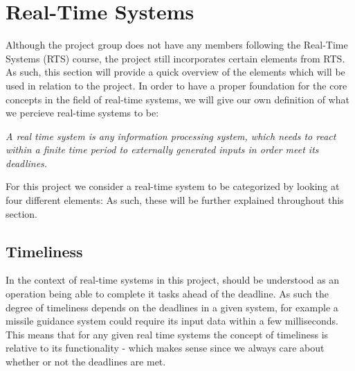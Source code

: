 \section{Real-Time Systems}
Although the project group does not have any members
following the Real-Time Systems (RTS) course, the project still incorporates certain elements from RTS.
As such, this section will provide a quick overview of the elements which will
be used in relation to the project.
In order to have a proper foundation for the core concepts in the field of
real-time systems, we will give our own definition of what we percieve real-time
systems to be:

\begin{center}
\begin{minipage}{0.8\linewidth}
\textit{A real time system is any information processing system, which needs to
react within a finite time period to externally generated inputs in order meet
its deadlines.}
\end{minipage}
\end{center}

For this project we consider a real-time system to be categorized by looking at
four different elements:  As such, these will be further
explained throughout this section.

\subsection{Timeliness}

In the context of real-time systems in this project,  should be understood as an operation being able to complete
it tasks ahead of the deadline. As such the degree of timeliness depends on the deadlines in a given system, for example a
missile guidance system could require its input data within a few milliseconds.
This means that for any given real time systems the concept of timeliness is
relative to its functionality - which makes sense since we always care about
whether or not the deadlines are met.


